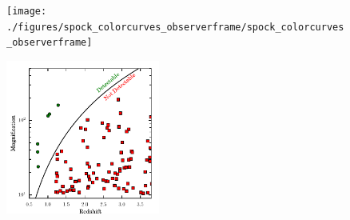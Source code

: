 \begin{figure}[tbp]
  \begin{center}
    \texttt{[image: ./figures/spock\_colorcurves\_observerframe/spock\_colorcurves\_observerframe]}
    \caption{\protect}
  \end{center}
\end{figure}

\begin{figure}[tbp]
  \begin{center}
    \includegraphics[width=0.45\textwidth]{./figures/hff_lensed_galaxies/hff_lensed_galaxies}
    \caption{\protect}
  \end{center}
\end{figure}


